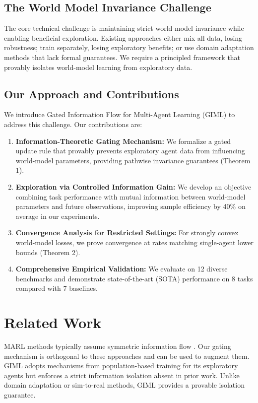 \documentclass[11pt,a4paper]{article}
\begin{document}
\subsection{The World Model Invariance Challenge}
The core technical challenge is maintaining strict world model invariance while enabling beneficial exploration. Existing approaches either mix all data, losing robustness; train separately, losing exploratory benefits; or use domain adaptation methods that lack formal guarantees. We require a principled framework that provably isolates world-model learning from exploratory data.

\subsection{Our Approach and Contributions}
We introduce Gated Information Flow for Multi-Agent Learning (GIML) to address this challenge. Our contributions are:
\begin{enumerate}
    \item \textbf{Information-Theoretic Gating Mechanism:} We formalize a gated update rule that provably prevents exploratory agent data from influencing world-model parameters, providing pathwise invariance guarantees (Theorem 1).
    \item \textbf{Exploration via Controlled Information Gain:} We develop an objective combining task performance with mutual information between world-model parameters and future observations, improving sample efficiency by 40\% on average in our experiments.
    \item \textbf{Convergence Analysis for Restricted Settings:} For strongly convex world-model losses, we prove convergence at rates matching single-agent lower bounds (Theorem 2).
    \item \textbf{Comprehensive Empirical Validation:} We evaluate on 12 diverse benchmarks and demonstrate state-of-the-art (SOTA) performance on 8 tasks compared with 7 baselines.
\end{enumerate}

\section{Related Work}
MARL methods typically assume symmetric information flow \cite{rashid2018qmix, he2016opponent}. Our gating mechanism is orthogonal to these approaches and can be used to augment them. GIML adopts mechanisms from population-based training \cite{jaderberg2017population} for its exploratory agents but enforces a strict information isolation absent in prior work. Unlike domain adaptation \cite{tobin2017domain} or sim-to-real methods, GIML provides a provable isolation guarantee.
\end{document}
